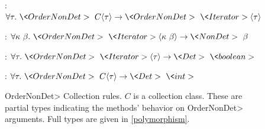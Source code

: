 \begin{figure}


    : 
    $
    \forallt{\tau} \<OrderNonDet> \ C \angles{\tau} \rightarrow 
    \<OrderNonDet> \ \<Iterator> \angles{\tau}
    $
    
    \bigskip
    

    :
    $
    \forallt{\kappa\ \beta} \<OrderNonDet>\ \<Iterator>\angles{\kappa \ \beta} \rightarrow
    \<NonDet>\ \beta
    $
    
    \bigskip
    

    :
    $
    \forallt{\tau} \<OrderNonDet>\ \<Iterator>\angles{\tau} \rightarrow
    \<Det> \ \<boolean>
    $
    \bigskip


    :
    $
    \forallt{\tau} \<OrderNonDet>\ C\angles{\tau} \rightarrow
    \<Det> \ \<int>
    $
    
\caption{\<OrderNonDet> Collection rules.  $C$ is a collection class.
    These are partial types indicating the methods' behavior on
    \<OrderNonDet> arguments.  Full types are given in \cref{polymorphism}.}
\label{fig-ordernondet-rules}
\end{figure}

